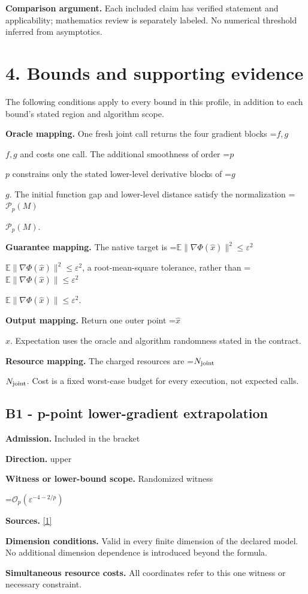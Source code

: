 \documentclass[10pt,a4paper]{article}
\newcommand{\AtlasMath}[1]{\par\begingroup\centering\setbox0=\hbox{$\displaystyle #1$}\ifdim\wd0>1.4\linewidth\typeout{ATLAS WIDE FORMULA: \the\wd0}\fi\ifdim\wd0>\linewidth\resizebox{\linewidth}{!}{\box0}\else\box0\fi\par\endgroup}
\newcommand{\AtlasInlineMath}[1]{\begingroup\setbox0=\hbox{$#1$}\ifdim\wd0>.4\linewidth\endgroup\AtlasMath{#1}\else\endgroup$#1$\fi}
\begin{document}
\textbf{Comparison argument.} Each included claim has verified statement and applicability; mathematics review is separately labeled. No numerical threshold inferred from asymptotics.

\section{4. Bounds and supporting evidence}
The following conditions apply to every bound in this profile, in addition to each bound's stated region and algorithm scope.

\textbf{Oracle mapping.} One fresh joint call returns the four gradient blocks \AtlasInlineMath{f,g} and costs one call. The additional smoothness of order \AtlasInlineMath{p} constrains only the stated lower-level derivative blocks of \AtlasInlineMath{g}. The initial function gap and lower-level distance satisfy the normalization \AtlasInlineMath{\mathcal P_p(M)}.

\textbf{Guarantee mapping.} The native target is \AtlasInlineMath{\mathbb E\|\nabla\Phi(\widehat x)\|^2\le\varepsilon^2}, a root-mean-square tolerance, rather than \AtlasInlineMath{\mathbb E\|\nabla\Phi(\widehat x)\|\le\varepsilon^2}.

\textbf{Output mapping.} Return one outer point \AtlasInlineMath{\widehat x}. Expectation uses the oracle and algorithm randomness stated in the contract.

\textbf{Resource mapping.} The charged resources are \AtlasInlineMath{N_{\rm joint}}. Cost is a fixed worst-case budget for every execution, not expected calls.

\subsection{B1 - p-point lower-gradient extrapolation}
\textbf{Admission.} Included in the bracket

\textbf{Direction.} upper

\textbf{Witness or lower-bound scope.} Randomized witness

\AtlasMath{\mathcal{O}_p(\varepsilon^{-4-2/p})}
\textbf{Sources.} \href{https://arxiv.org/pdf/2610.01843v1}{[1]}

\textbf{Dimension conditions.} Valid in every finite dimension of the declared model. No additional dimension dependence is introduced beyond the formula.

\textbf{Simultaneous resource costs.} All coordinates refer to this one witness or necessary constraint.
\end{document}

